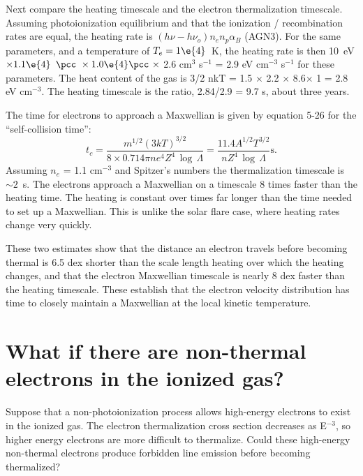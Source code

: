 \documentclass[debug, preprint, twocolumn]{rmaa}
\begin{document}
Next compare the heating timescale and the electron thermalization timescale.  
Assuming photoionization equilibrium and that the ionization / recombination rates are equal, 
the heating rate is $(h\nu - h\nu_o) n_e n_p \alpha_B$ (AGN3).
For the same parameters, 
and a temperature of $T_{e} = 1\e{4}$~K,
the heating rate is then 
10~eV $\times 1.1\e{4}$ 
$\pcc\ \times 1.0\e{4} \pcc\  \times $
2.6 cm$^3$ s$^{-1}$ = 2.9 eV cm$^{-3}$ s$^{-1}$ 
for these parameters.  
The heat content of the gas is 
3/2 nkT = 1.5 $\times$ 2.2 $\times$ 8.6$\times$ 1   = 2.8 eV cm$^{-3}$.  
The heating timescale is the ratio, 2.84/2.9 = 9.7 s, about three years.  

The time for electrons to approach a Maxwellian is given by \citet{Spitzer1962} 
equation 5-26 for the ``self-collision time'':
\begin{equation}
t_c = \frac{m^{1/2} (3kT)^{3/2}}{8\times 0.714 \pi n e^4 Z^4 \, \log\, \Lambda}
= \frac{11.4 A^{1/2} T^{3/2}}{nZ^4 \, \log\, \Lambda} \textrm{s}.
\end{equation}
Assuming $n_e$ = 1.1 cm$^{-3}$ and Spitzer's numbers the thermalization timescale is $\sim 2$~s.  
The electrons approach a Maxwellian on a timescale 8 times faster than the heating time.  
The heating is constant over times far longer than the time needed to set up a Maxwellian.
This is unlike the solar flare case, where heating rates change very quickly.

These two estimates show that the distance an electron travels
before becoming thermal is 6.5 dex shorter than the scale length heating over which the heating changes, 
and that the electron Maxwellian timescale is nearly 8 dex faster than the heating timescale.  
These establish that the electron velocity distribution has time to closely 
maintain a Maxwellian at the local kinetic temperature.


\section{What if there are non-thermal electrons in the ionized gas?}
\label{sec:WhatIf}

Suppose that a non-photoionization process allows high-energy electrons to exist in the ionized gas.
The electron thermalization cross section
decreases as E$^{-3}$, so higher energy electrons are more difficult to thermalize.
Could these high-energy non-thermal electrons produce forbidden line emission before becoming thermalized?  
\end{document}
